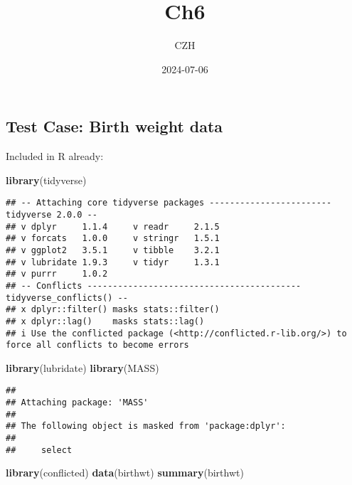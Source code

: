 \documentclass[
]{article}
\title{Ch6}
\author{CZH}
\date{2024-07-06}
\newenvironment{Shaded}{\begin{snugshade}}{\end{snugshade}}
\newcommand{\FunctionTok}[1]{\textcolor[rgb]{0.13,0.29,0.53}{\textbf{#1}}}
\newcommand{\NormalTok}[1]{#1}
\begin{document}
\maketitle

\subsection{Test Case: Birth weight
data}\label{test-case-birth-weight-data}

Included in R already:

\begin{Shaded}
\begin{Highlighting}[]
\FunctionTok{library}\NormalTok{(tidyverse)}
\end{Highlighting}
\end{Shaded}

\begin{verbatim}
## -- Attaching core tidyverse packages ------------------------ tidyverse 2.0.0 --
## v dplyr     1.1.4     v readr     2.1.5
## v forcats   1.0.0     v stringr   1.5.1
## v ggplot2   3.5.1     v tibble    3.2.1
## v lubridate 1.9.3     v tidyr     1.3.1
## v purrr     1.0.2     
## -- Conflicts ------------------------------------------ tidyverse_conflicts() --
## x dplyr::filter() masks stats::filter()
## x dplyr::lag()    masks stats::lag()
## i Use the conflicted package (<http://conflicted.r-lib.org/>) to force all conflicts to become errors
\end{verbatim}

\begin{Shaded}
\begin{Highlighting}[]
\FunctionTok{library}\NormalTok{(lubridate)}
\FunctionTok{library}\NormalTok{(MASS)}
\end{Highlighting}
\end{Shaded}

\begin{verbatim}
## 
## Attaching package: 'MASS'
## 
## The following object is masked from 'package:dplyr':
## 
##     select
\end{verbatim}

\begin{Shaded}
\begin{Highlighting}[]
\FunctionTok{library}\NormalTok{(conflicted)}
\FunctionTok{data}\NormalTok{(birthwt)}
\FunctionTok{summary}\NormalTok{(birthwt)}
\end{Highlighting}
\end{Shaded}
\end{document}
